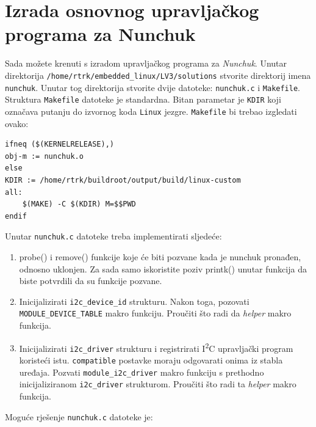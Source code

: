 \documentclass[11pt]{article}
\begin{document}
\section{Izrada osnovnog upravljačkog programa za Nunchuk}
Sada možete krenuti s izradom upravljačkog programa za \textit{Nunchuk}.
Unutar direktorija \texttt{/home/rtrk/embedded\_linux/LV3/solutions} stvorite
direktorij imena \texttt{nunchuk}. Unutar tog direktorija stvorite dvije
datoteke: \texttt{nunchuk.c} i \texttt{Makefile}.
\newline
\newline
Struktura \texttt{Makefile} datoteke je standardna. Bitan parametar je
\texttt{KDIR} koji označava putanju do izvornog koda \texttt{Linux} jezgre.
\newline
\newline
\texttt{Makefile} bi trebao izgledati ovako:
\begin{lstlisting}
ifneq ($(KERNELRELEASE),)
obj-m := nunchuk.o
else
KDIR := /home/rtrk/buildroot/output/build/linux-custom
all:
	$(MAKE) -C $(KDIR) M=$$PWD
endif
\end{lstlisting}
Unutar \texttt{nunchuk.c} datoteke treba implementirati sljedeće:
\begin{enumerate}
	\item probe() i remove() funkcije koje će biti pozvane kada je nunchuk
pronađen, odnosno uklonjen. Za sada samo iskoristite poziv printk() unutar
funkcija da biste potvrdili da su funkcije pozvane.
	\item Inicijalizirati \texttt{i2c\_device\_id} strukturu. Nakon toga,
		pozovati \texttt{MODULE\_DEVICE\_TABLE} makro funkciju. Proučiti
		što radi da \textit{helper} makro funkcija.
	\item Inicijalizirati \texttt{i2c\_driver} strukturu i registrirati
		I\textsuperscript{2}C upravljački program koristeći istu.
		\texttt{compatible} postavke moraju odgovarati onima iz stabla
		uređaja. Pozvati \texttt{module\_i2c\_driver} makro funkciju s
		prethodno inicijaliziranom \texttt{i2c\_driver} strukturom.
		Proučiti što radi ta \textit{helper} makro funkcija.
\end{enumerate}
\newpage
\noindent Moguće rješenje \texttt{nunchuk.c} datoteke je:
\end{document}
